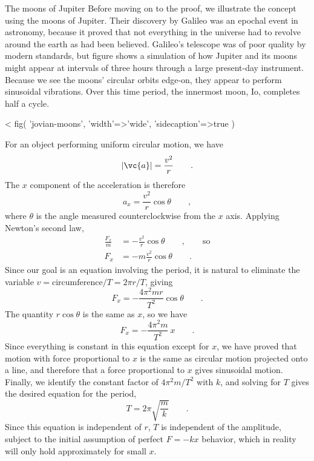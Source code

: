 \begin{eg}{The moons of Jupiter}\label{eg:jovian-moons}
Before moving on to the proof, we illustrate the concept
using the moons
of Jupiter. Their discovery by Galileo was an epochal event
in astronomy, because it proved that not everything in the
universe had to revolve around the earth as had been
believed. Galileo's telescope was of poor quality by modern
standards, but figure  shows a simulation of how
Jupiter and its moons might appear at intervals of three
hours through a large present-day instrument. Because we see
the moons' circular orbits edge-on, they appear to perform
sinusoidal vibrations. Over this time period, the innermost
moon, Io, completes half a cycle.
\end{eg}

<%
  fig(
    'jovian-moons',
    {
      'width'=>'wide',
      'sidecaption'=>true
    }
  )


For an object performing uniform circular motion, we have
\begin{equation*}
                |\vc{a}|         =    \frac{v^2}{r}   \qquad   .
\end{equation*}
The $x$ component of the acceleration is therefore
\begin{equation*}
                        a_x         =    \frac{v^2}{r}\cos\theta   \qquad   ,
\end{equation*}
where $\theta $ is the angle measured counterclockwise from
the $x$ axis. Applying Newton's second law,
\begin{align*}
 \frac{F_x}{m} &= -\frac{v^2}{r}\cos\theta \qquad , \qquad \text{so} \\
 F_x &= -m\frac{v^2}{r}\cos\theta \qquad .
\end{align*}
Since our goal is an equation involving the period, it is
natural to eliminate the variable $v = \text{circumference}/T=2\pi r/T$, giving
\begin{equation*}
                        F_x         =    -\frac{4\pi^2 mr}{T^2}\cos\theta   \qquad   .
\end{equation*}
The quantity $r \cos \theta $ is the same as $x$, so we have
\begin{equation*}
                        F_x         =    -\frac{4\pi^2 m}{T^2}\: x    \qquad   .
\end{equation*}
Since everything is constant in this equation except for
$x$, we have proved that motion with force proportional to
$x$ is the same as circular motion projected onto a line,
and therefore that a force proportional to $x$ gives
sinusoidal motion. Finally, we identify the constant factor
of $4\pi^2m/T^2$ with $k$, and solving for $T$ gives the desired
equation for the period,
\begin{equation*}
                        T         =     2\pi\sqrt{\frac{m}{k}}  \qquad   .
\end{equation*}
Since this equation is independent of $r$, $T$ is independent of the amplitude,
subject to the initial assumption of perfect $F=-kx$ behavior, which in reality
will only hold approximately for small $x$.

